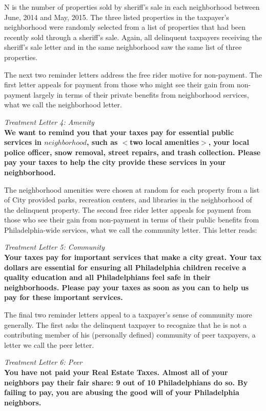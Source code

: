 \documentclass[12pt]{article}
\begin{document}
N is the number of properties sold by sheriff's sale in each
neighborhood between June, 2014 and May, 2015.  The three listed
properties in the taxpayer's neighborhood were randomly selected from
a list of properties that had been recently sold through a sheriff's
sale.  Again, all delinquent taxpayers receiving the sheriff's sale
letter and in the same neighborhood saw the same list of three
properties.

The next two reminder letters address the free rider motive for
non-payment.  The first letter appeals for payment from those who
might see their gain from non-payment largely in terms of their
private benefits from neighborhood services, what we call the
neighborhood letter.  

{\it Treatment Letter 4: Amenity } \\ {\bf We want to remind you that
  your taxes pay for essential public services in $neighborhood$, such
  as $<$two local amenities$>$, your local police officer, snow
  removal, street repairs, and trash collection. Please pay your taxes
  to help the city provide these services in your neighborhood.}

The neighborhood amenities were chosen at random for each property
from a list of City provided parks, recreation centers, and libraries
in the neighborhood of the delinquent property.  The second free rider
letter appeals for payment from those who see their gain from
non-payment in terms of their public benefits from Philadelphia-wide
services, what we call the community letter.  This letter reads:

{\it Treatment Letter 5: Community} \\ {\bf Your taxes pay for important
  services that make a city great. Your tax dollars are essential for
  ensuring all Philadelphia children receive a quality education and
  all Philadelphians feel safe in their neighborhoods. Please pay your
  taxes as soon as you can to help us pay for these important
  services.}

The final two reminder letters appeal to a taxpayer's sense of
community more generally.  The first asks the delinquent taxpayer to
recognize that he is not a contributing member of his (personally
defined) community of peer taxpayers, a letter we call the peer
letter.  

{\it Treatment Letter 6: Peer} \\ {\bf You have not paid your Real
  Estate Taxes. Almost all of your neighbors pay their fair share: 9
  out of 10 Philadelphians do so. By failing to pay, you are abusing
  the good will of your Philadelphia neighbors.}
\end{document}
